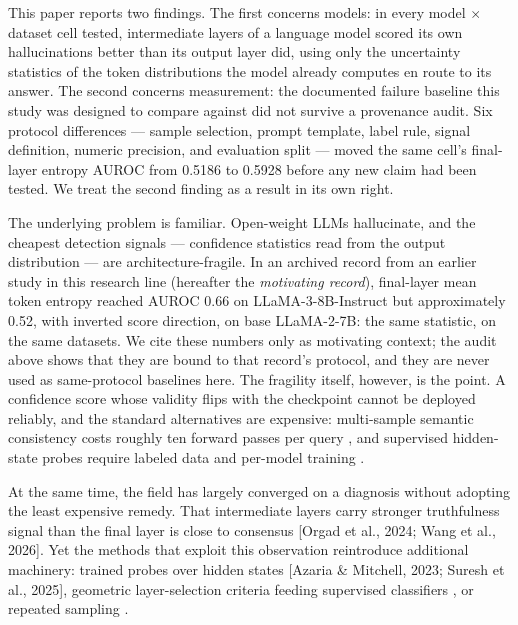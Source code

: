
This paper reports two findings. The first concerns models: in every model $\times$ dataset cell tested, intermediate layers of a language model scored its own hallucinations better than its output layer did, using only the uncertainty statistics of the token distributions the model already computes en route to its answer. The second concerns measurement: the documented failure baseline this study was designed to compare against did not survive a provenance audit. Six protocol differences --- sample selection, prompt template, label rule, signal definition, numeric precision, and evaluation split --- moved the same cell's final-layer entropy AUROC from 0.5186 to 0.5928 before any new claim had been tested. We treat the second finding as a result in its own right.

The underlying problem is familiar. Open-weight LLMs hallucinate, and the cheapest detection signals --- confidence statistics read from the output distribution --- are architecture-fragile. In an archived record from an earlier study in this research line (hereafter the \textit{motivating record}), final-layer mean token entropy reached AUROC 0.66 on LLaMA-3-8B-Instruct but approximately 0.52, with inverted score direction, on base LLaMA-2-7B: the same statistic, on the same datasets. We cite these numbers only as motivating context; the audit above shows that they are bound to that record's protocol, and they are never used as same-protocol baselines here. The fragility itself, however, is the point. A confidence score whose validity flips with the checkpoint cannot be deployed reliably, and the standard alternatives are expensive: multi-sample semantic consistency costs roughly ten forward passes per query \citep{Farquhar2024}, and supervised hidden-state probes require labeled data and per-model training \citep{Azaria2023}.

At the same time, the field has largely converged on a diagnosis without adopting the least expensive remedy. That intermediate layers carry stronger truthfulness signal than the final layer is close to consensus [Orgad et al., 2024; Wang et al., 2026]. Yet the methods that exploit this observation reintroduce additional machinery: trained probes over hidden states [Azaria \& Mitchell, 2023; Suresh et al., 2025], geometric layer-selection criteria feeding supervised classifiers \citep{Wang2026}, or repeated sampling \citep{Zhang2024SLED}.

